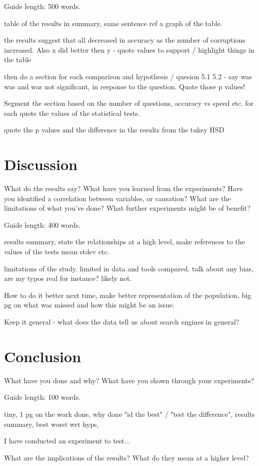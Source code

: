 \documentclass{csfourzero}
\begin{document}
Guide length: 500 words.

table of the results in summary, same sentence ref a graph of the table.

the results suggest that all decreased in accuracy as the number of corruptions increased. Also x did better then y - quote values to support / highlight things in the table

then do a section for each comparison and hypothesis / quesion 5.1 5.2 - say was was and was not significant, in response to the question. Quote those p values!

Segment the section based on the number of questions, accuracy vs speed etc. for each quote the values of the statistical tests.

quote the p values and the difference in the results from the tukey HSD

\section{Discussion}
\label{sec:discuss}

What do the results say? What have you learned from the
experiments? Have you identified a correlation between variables, or
causation? What are the limitations of what you've done? What further
experiments might be of benefit?

Guide length: 400 words.

results summary, state the relationships at a high level, make references to the values of the tests mean stdev etc.

limitations of the study. limited in data and tools compared. talk about any bias, are my typos real for instance? likely not.

How to do it better next time, make better representation of the population, big pg on what was missed and how this might be an issue.

Keep it general - what does the data tell us about search engines in general?

\section{Conclusion}
\label{sec:conc}

What have you done and why? What have you shown through your
experiments?

Guide length: 100 words.

tiny, 1 pg on the work done, why done "id the best" / "test the difference", results summary, best worst wrt hyps,

I have conducted an experiment to test...

What are the implications of the results? What do they mean at a higher level?


\end{document}

